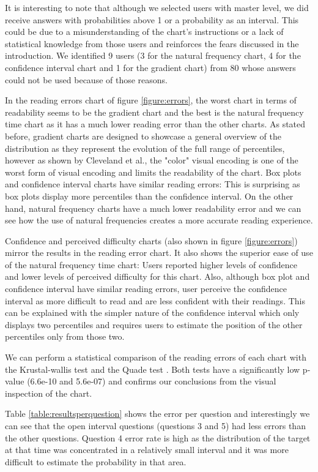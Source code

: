 \documentclass[a4paper,3p,sort&compress]{elsarticle}
\begin{document}
It is interesting to note that although we selected users with master level, we did receive answers with probabilities 
above 1 or a probability as an interval. This could be due to a misunderstanding of the chart's instructions or 
a lack of statistical knowledge from those 
users and reinforces the fears discussed in the introduction. We identified 9 users (3 for the natural frequency chart, 
4 for the confidence interval chart and 1 for the gradient chart)
 from 80 whose answers could not be used because of those reasons.

In the reading errors chart of figure \ref{figure:errors}, the worst chart in terms of readability seems to be the 
gradient chart and the best is the natural frequency time chart as it has a much lower reading error than the other charts. As stated before, 
gradient charts are designed to showcase a general overview of the distribution as they represent the evolution of the
full range of percentiles, however as shown by Cleveland et al., the "color" visual encoding is one of the 
worst form of visual encoding and limits the readability of the chart. Box plots and confidence interval charts have similar reading errors: This is surprising
as box plots display more percentiles than the confidence interval. On the other hand, natural 
frequency charts have a much lower readability error and we can see how the use of natural frequencies creates a more accurate reading experience.

Confidence and perceived difficulty charts (also shown in figure \ref{figure:errors}) mirror the results in the reading error chart.
It also shows the superior ease of use 
of the natural frequency time chart: Users reported higher levels of confidence and 
lower levels of perceived difficulty for this chart. Also, although box plot and confidence interval have similar reading errors,
user perceive the confidence interval as more difficult to read and are less confident with their readings. This can be explained with 
the simpler nature of the confidence interval which only displays two percentiles and requires users to estimate the position of the other 
percentiles only from those two.

We can perform a statistical comparison of the reading errors of each chart with the Krustal-wallis test \cite{krustal} and 
the Quade test \cite{quade_rank_1967}. Both tests have a 
significantly low p-value (6.6e-10 and 5.6e-07) and confirms our conclusions from the visual inspection of the chart.

Table \ref{table:resultsperquestion} shows the error per question and interestingly we can see that the open interval questions (questions 3 and 5) 
had less errors than the other questions. Question 4 error rate is high as the distribution of the target at that time was concentrated in a relatively 
small interval and it was more difficult to estimate the probability in that area. 
\end{document}
